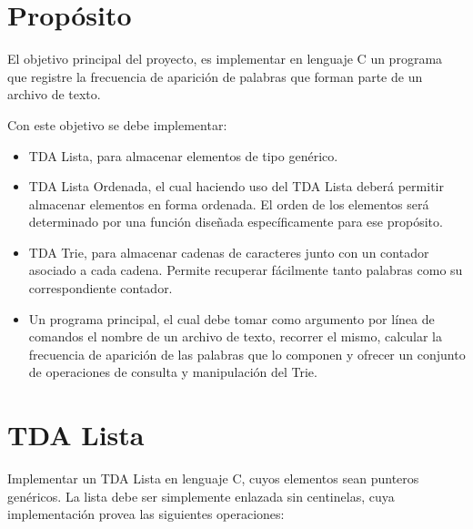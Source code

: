 \documentclass[12pt,a4paper]{article}
\begin{document}

\section*{Propósito}
El objetivo principal del proyecto, es implementar en lenguaje C un programa que registre la frecuencia de aparición de palabras que forman parte de un archivo de texto. 

Con este objetivo se debe implementar:
\begin{itemize}
	
	\item TDA Lista, para almacenar elementos de tipo genérico.
	
	\item TDA Lista Ordenada, el cual haciendo uso del TDA Lista deberá permitir almacenar elementos en forma ordenada. El orden de los elementos será determinado por una función diseñada específicamente para ese propósito. 
	
	\item TDA Trie, para almacenar cadenas de caracteres junto con un contador asociado a cada cadena. Permite recuperar fácilmente tanto palabras como su correspondiente contador. 
	
	\item Un programa principal, el cual debe tomar como argumento por línea de comandos el nombre de un archivo de texto, recorrer el mismo, calcular la frecuencia de aparición de las palabras que lo componen y ofrecer un conjunto de operaciones de consulta y manipulación del Trie.
	
\end{itemize}

\section{TDA Lista}
Implementar un TDA Lista en lenguaje C, cuyos elementos sean punteros genéricos. La lista debe ser simplemente enlazada sin centinelas, cuya implementación provea las siguientes operaciones:
\end{document}
